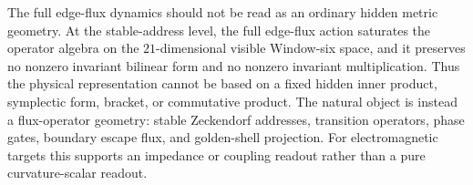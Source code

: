 \begin{principle}
\label{prin:zeckendorf-window-six-flux-operator-geometry}
The full edge-flux dynamics should not be read as an ordinary hidden
metric geometry. At the stable-address level, the full edge-flux action
saturates the operator algebra on the \(21\)-dimensional visible
Window-six space, and it preserves no nonzero invariant bilinear form and
no nonzero invariant multiplication. Thus the physical representation
cannot be based on a fixed hidden inner product, symplectic form, bracket,
or commutative product. The natural object is instead a flux-operator
geometry: stable Zeckendorf addresses, transition operators, phase gates,
boundary escape flux, and golden-shell projection. For electromagnetic
targets this supports an impedance or coupling readout rather than a pure
curvature-scalar readout.
\end{principle}

